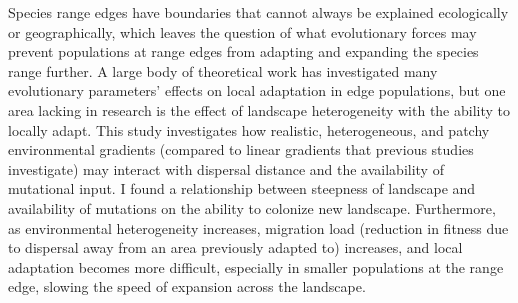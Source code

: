 	
	Species range edges have boundaries that cannot always be explained ecologically or geographically, which leaves the question of what evolutionary forces may prevent populations at range edges from adapting and expanding the species range further. A large body of theoretical work has investigated many evolutionary parameters' effects on local adaptation in edge populations, but one area lacking in research is the effect of landscape heterogeneity with the ability to locally adapt. This study investigates how realistic, heterogeneous, and patchy environmental gradients (compared to linear gradients that previous studies investigate) may interact with dispersal distance and the availability of mutational input. I found a relationship between steepness of landscape and availability of mutations on the ability to colonize new landscape. Furthermore, as environmental heterogeneity increases, migration load (reduction in fitness due to dispersal away from an area previously adapted to) increases, and local adaptation becomes more difficult, especially in smaller populations at the range edge, slowing the speed of expansion across the landscape.
	
